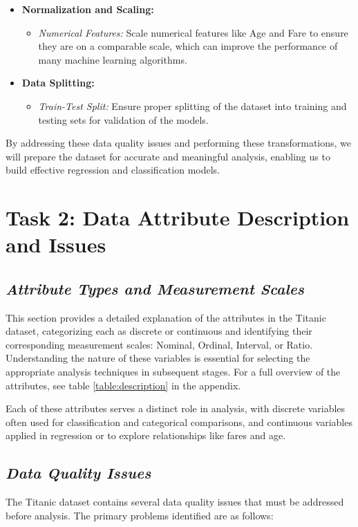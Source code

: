 \documentclass[twoside,11pt]{article}
\makeatletter
\let\@oldsection\section
\renewcommand\section[1]{\@oldsection*{#1}}
\let\@oldsubsection\subsection
\renewcommand\subsection[1]{\@oldsubsection*{\textit{#1}}}
\makeatother
\begin{document}
\begin{itemize}
\begin{itemize}
    \end{itemize}
    \item \textbf{Normalization and Scaling:}
    \begin{itemize}
        \item \textit{Numerical Features:} Scale numerical features like Age and Fare to ensure they are on a comparable scale, which can improve the performance of many machine learning algorithms.
    \end{itemize}
    \item \textbf{Data Splitting:}
    \begin{itemize}
        \item \textit{Train-Test Split:} Ensure proper splitting of the dataset into training and testing sets for validation of the models.
    \end{itemize}
\end{itemize}

By addressing these data quality issues and performing these transformations, we will prepare the dataset for accurate and meaningful analysis, enabling us to build effective regression and classification models.


\section{Task 2: Data Attribute Description and Issues}

\subsection{Attribute Types and Measurement Scales}
This section provides a detailed explanation of the attributes in the Titanic dataset, categorizing each as discrete or continuous and identifying their corresponding measurement scales: Nominal, Ordinal, Interval, or Ratio. Understanding the nature of these variables is essential for selecting the appropriate analysis techniques in subsequent stages. For a full overview of the attributes, see table \ref{table:description} in the appendix.

Each of these attributes serves a distinct role in analysis, with discrete variables often used for classification and categorical comparisons, and continuous variables applied in regression or to explore relationships like fares and age.

\subsection{Data Quality Issues}
The Titanic dataset contains several data quality issues that must be addressed before analysis. The primary problems identified are as follows:
\end{document}
